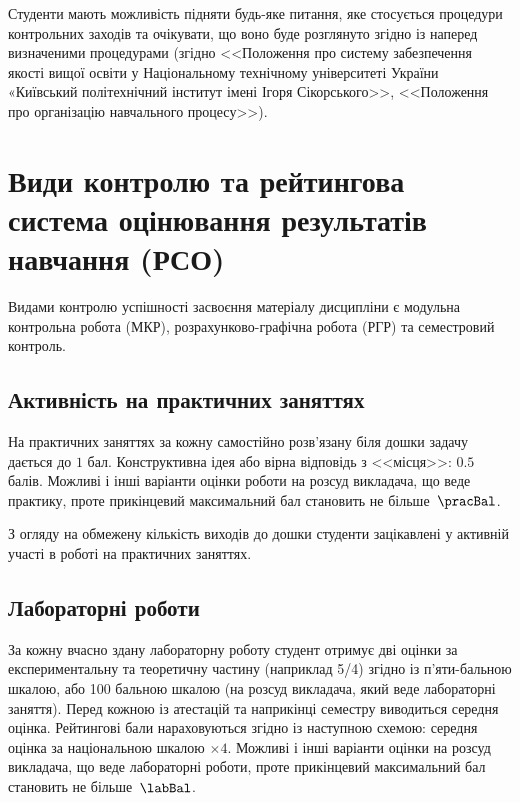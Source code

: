 \documentclass{Syllabus}
\begin{document}
Студенти мають можливість підняти будь-яке питання, яке стосується процедури контрольних заходів та очікувати, що воно буде розглянуто згідно із наперед визначеними процедурами (згідно <<Положення про систему забезпечення якості вищої освіти у Національному технічному університеті України «Київський політехнічний інститут імені Ігоря Сікорського>>, <<Положення про організацію навчального процесу>>).

\section{Види контролю та рейтингова система оцінювання результатів навчання (РСО)}

%

Видами контролю успішності засвоєння матеріалу дисципліни є  модульна контрольна робота (МКР), розрахунково-графічна робота (РГР) та семестровий контроль.


\subsection*{Активність на практичних заняттях}

На практичних заняттях за кожну самостійно розв’язану біля дошки задачу дається до $1$ бал. Конструктивна ідея або вірна відповідь з <<місця>>: $0.5$ балів. Можливі і інші варіанти оцінки роботи на розсуд викладача, що веде практику, проте прикінцевий максимальний бал становить не більше~$\pracBal$.

З огляду на обмежену кількість виходів до дошки студенти зацікавлені у активній участі в роботі на практичних заняттях.

\subsection*{Лабораторні роботи}

За кожну вчасно здану лабораторну роботу студент отримує дві оцінки за експериментальну та теоретичну частину (наприклад 5/4) згідно із п'яти-бальною шкалою, або 100 бальною шкалою (на розсуд викладача, який веде лабораторні заняття). Перед кожною із атестацій та наприкінці семестру виводиться середня оцінка. Рейтингові бали нараховуються згідно із наступною схемою: середня оцінка за національною шкалою $\times 4$. Можливі і інші варіанти оцінки на розсуд викладача, що веде лабораторні роботи, проте прикінцевий максимальний бал становить не більше~$\labBal$.
\end{document}
